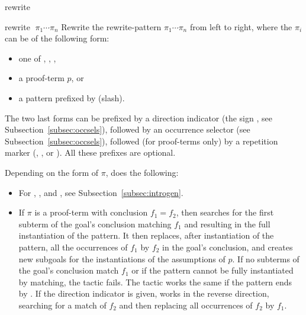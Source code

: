 \begin{tactic}{rewrite}
  \begin{tsyntax}{rewrite $\;\pi_1 \cdots \pi_n$}
  Rewrite the rewrite-pattern $\pi_1 \cdots \pi_n$ from left to right,
  where the $\pi_i$ can be of the following form:
  \begin{itemize}
  \item one of \ec{//}, \ec{/=}, \ec{//=},
  \item a proof-term $p$, or
  \item a pattern prefixed by \ec{/} (slash).
  \end{itemize}
  The two last forms can be prefixed by a direction indicator (the
  sign \ec{-}, see Subsection~\ref{subsec:occsels}), followed by an
  occurrence selector (see Subsection~\ref{subsec:occsels}), followed
  (for proof-terms only) by a repetition marker (\ec{!}, ,
   or ). All these prefixes are optional.

  \smallskip
  Depending on the form of $\pi$,  does the following:
    \begin{itemize}
    \item For \ec{//}, \ec{/=}, and \ec{//=}, see
      Subsection~\ref{subsec:introgen}.

    \item If $\pi$ is a proof-term with conclusion $f_1=f_2$, then
       searches for the first subterm of the goal's
      conclusion matching $f_1$ and resulting in the full
      instantiation of the pattern.  It then replaces, after
      instantiation of the pattern, all the occurrences of $f_1$ by
      $f_2$ in the goal's conclusion, and creates new subgoals for the
      instantiations of the assumptions of $p$.  If no subterms of the
      goal's conclusion match $f_1$ or if the pattern cannot be fully
      instantiated by matching, the tactic fails.  The tactic works
      the same if the pattern ends by . If the
      direction indicator \ec{-} is given,  works in the
      reverse direction, searching for a match of $f_2$ and then
      replacing all occurrences of $f_2$ by $f_1$.


\end{itemize}
\end{tsyntax}
\end{tactic}
